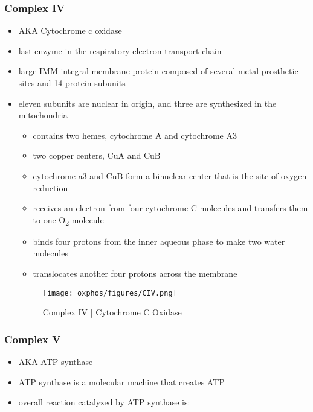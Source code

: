 \documentclass[12pt]{scrartcl}
\begin{document}
\subsubsection{Complex IV}
\label{sec:org2af829c}
\begin{itemize}
\item AKA Cytochrome c oxidase
\item last enzyme in the respiratory electron transport chain
\item large IMM integral membrane protein composed of several metal prosthetic sites and 14 protein subunits
\item eleven subunits are nuclear in origin, and three are synthesized in the mitochondria
\begin{itemize}
\item contains two hemes, cytochrome A and cytochrome A3
\item two copper centers, CuA and CuB
\item cytochrome a3 and CuB form a binuclear center that is the site of
oxygen reduction
\item receives an electron from four cytochrome C molecules and
transfers them to one O\textsubscript{2} molecule
\end{itemize}

{\small{}}

\begin{itemize}
\item binds four protons from the inner aqueous phase to make two water
molecules
\item translocates another four protons across the membrane
\end{itemize}

\begin{figure}[htbp]
\centering
\texttt{[image: oxphos/figures/CIV.png]}
\caption[cIV]{\label{fig:org5c4fa87}Complex IV | Cytochrome C Oxidase}
\end{figure}
\end{itemize}

\subsubsection{Complex V}
\label{sec:orge28e87d}
\begin{itemize}
\item AKA ATP synthase
\item ATP synthase is a molecular machine that creates ATP
\item overall reaction catalyzed by ATP synthase is:
\end{itemize}
\end{document}
